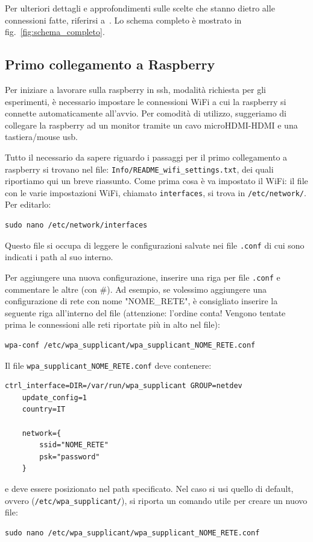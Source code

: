 Per ulteriori dettagli e approfondimenti sulle scelte che stanno dietro alle connessioni fatte, riferirsi a~\cite{ptvlocalizzazione}.
Lo schema completo è mostrato in fig.~\ref{fig:schema_completo}.

\subsection{Primo collegamento a Raspberry}
\label{sez: primo collegamento a raspberry}

Per iniziare a lavorare sulla raspberry in ssh, modalità richiesta per gli esperimenti, è necessario impostare le connessioni WiFi a cui la raspberry si
connette automaticamente all'avvio. Per comodità di utilizzo, suggeriamo di collegare la raspberry ad un monitor tramite un cavo microHDMI-HDMI e una tastiera/mouse usb.

Tutto il necessario da sapere riguardo i passaggi per il primo collegamento a raspberry si trovano nel file: \texttt{Info/README\_wifi\_settings.txt}, dei quali riportiamo qui un breve riassunto.
Come prima cosa è va impostato il WiFi: il file con le varie impostazioni WiFi, chiamato \texttt{interfaces}, si trova in \texttt{/etc/network/}. Per editarlo:
\begin{lstlisting}[style=bash]
	sudo nano /etc/network/interfaces
\end{lstlisting}
Questo file si occupa di leggere le configurazioni salvate nei file \texttt{.conf} di cui sono indicati i path al suo interno. 

Per aggiungere una nuova configurazione, inserire una riga per file \texttt{.conf} e commentare le altre (con \#).
Ad esempio, se volessimo aggiungere una configurazione di rete con nome "NOME\_RETE", \`e consigliato inserire la seguente riga all'interno del file (attenzione: l'ordine conta! Vengono tentate prima le connessioni alle reti riportate più in alto nel file):
\begin{lstlisting}[style=xml]
	wpa-conf /etc/wpa_supplicant/wpa_supplicant_NOME_RETE.conf
\end{lstlisting}
Il file \verb|wpa_supplicant_NOME_RETE.conf| deve contenere:
\begin{lstlisting}[style=xml]
	ctrl_interface=DIR=/var/run/wpa_supplicant GROUP=netdev
	update_config=1
	country=IT

	network={
		ssid="NOME_RETE"
		psk="password"
	}
\end{lstlisting}
e deve essere posizionato nel path specificato. 
Nel caso si usi quello di default, ovvero (\texttt{/etc/wpa\_supplicant/}), si riporta un comando utile per creare un nuovo file:
\begin{lstlisting}[style=bash]
	sudo nano /etc/wpa_supplicant/wpa_supplicant_NOME_RETE.conf
\end{lstlisting}

